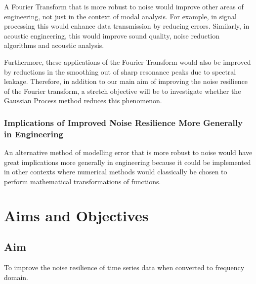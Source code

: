 \documentclass[12pt]{article}
\begin{document}
    A Fourier Transform that is more robust to noise would improve other areas of engineering, not just in the context of modal analysis.
    For example, in signal processing this would enhance data transmission by reducing errors.
    Similarly, in acoustic engineering, this would improve sound quality, noise reduction algorithms and acoustic analysis.

    Furthermore, these applications of the Fourier Transform would also be improved by reductions in the smoothing out of sharp resonance peaks due to spectral leakage.
    Therefore, in addition to our main aim of improving the noise resilience of the Fourier transform, a stretch objective will be to investigate whether the Gaussian Process method reduces this phenomenon.

    \subsubsection{Implications of Improved Noise Resilience More Generally in Engineering}

    An alternative method of modelling error that is more robust to noise would have great implications more generally in engineering because it could be implemented in other contexts where numerical methods would classically be chosen to perform mathematical transformations of functions.

    \section{Aims and Objectives}
    \subsection{Aim}
    To improve the noise resilience of time series data when converted to frequency domain.
\end{document}
